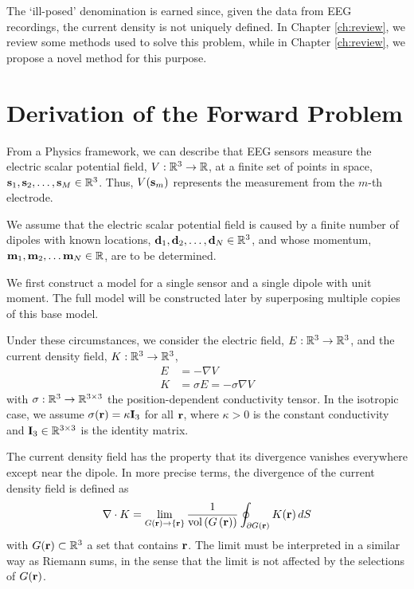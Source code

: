 The `ill-posed' denomination is earned since, given the data from EEG recordings, the current density is not uniquely defined.
%
In Chapter \ref{ch:review}, we review some methods used to solve this problem, while in Chapter \ref{ch:review}, we propose a novel method for this purpose.


\section{Derivation of the Forward Problem}
\label{sec:forward_derivation}

From a Physics framework, we can describe that EEG sensors measure the electric scalar potential field, $V: \mathbb{R}^3 \rightarrow \mathbb{R}$, at a finite set of points in space, $\mathbf{s}_{1}, \mathbf{s}_2, \dots, \mathbf{s}_M \in \mathbb{R}^3$. 
%
Thus, $V(\mathbf{s}_m)$ represents the measurement from the $m$-th electrode.

We assume that the electric scalar potential field is caused by a finite number of dipoles with known locations, ${\mathbf{d}_1, \mathbf{d}_2, \dots, \mathbf{d}_N \in \mathbb{R}^3}$, and whose momentum, $\mathbf{m}_1, \mathbf{m}_2, \dots \mathbf{m}_N \in \mathbb{R}$, are to be determined.

We first construct a model for a single sensor and a single dipole with unit moment. 
%
The full model will be constructed later by superposing multiple copies of this base model.

Under these circumstances, we consider the electric field, $E: \mathbb{R}^3 \rightarrow \mathbb{R}^3$, and the current density field, $K: \mathbb{R}^3 \rightarrow \mathbb{R}^3$,
\begin{align}
E &= - \nabla V
\\
K &= \sigma E = - \sigma \nabla V
\label{eq:model1}
\end{align}
with $\sigma: \mathbb{R}^3 \rightarrow \mathbb{R}^{3\times 3}$ the position-dependent conductivity tensor. 
%
In the isotropic case, we assume
$\sigma(\mathbf{r}) = \kappa \mathbf{I}_3$
for all $\mathbf{r}$, where $\kappa>0$ is the constant conductivity and $\mathbf{I}_3 \in \mathbb{R}^{3\times 3}$ is the identity matrix.

The current density field has the property that its divergence vanishes everywhere except near the dipole.
%
In more precise terms, the divergence of the current density field is defined as
\begin{equation}
\nabla \cdot K = \lim_{G(\mathbf{r}) \rightarrow \left\{ \mathbf{r} \right\}} \frac{1}{\text{vol}\left( G\left( \mathbf{r} \right) \right)}
\oint_{\partial G(\mathbf{r})} K(\mathbf{r})\, dS
\label{eq:divK}
\end{equation}
with $G(\mathbf{r})\subset \mathbb{R}^3$ a set that contains $\mathbf{r}$. 
%
The limit must be interpreted in a similar way as Riemann sums, in the sense that the limit is not affected by the selections of $G(\mathbf{r})$.

